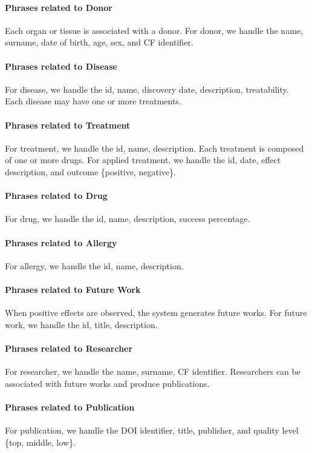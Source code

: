 \documentclass[11pt,a4paper]{article}
\begin{document}
\paragraph{Phrases related to Donor} 
Each organ or tissue is associated with a donor. For donor, we handle the name, surname, date of birth, age, sex, and CF identifier.

\paragraph{Phrases related to Disease} 
For disease, we handle the id, name, discovery date, description, treatability. Each disease may have one or more treatments.

\paragraph{Phrases related to Treatment} 
For treatment, we handle the id, name, description. Each treatment is composed of one or more drugs. For applied treatment, we handle the id, date, effect description, and outcome \{positive, negative\}.

\paragraph{Phrases related to Drug} 
For drug, we handle the id, name, description, success percentage. 

\paragraph{Phrases related to Allergy} 
For allergy, we handle the id, name, description.

\paragraph{Phrases related to Future Work} 
When positive effects are observed, the system generates future works. For future work, we handle the id, title, description.

\paragraph{Phrases related to Researcher} 
For researcher, we handle the name, surname, CF identifier. Researchers can be associated with future works and produce publications.

\paragraph{Phrases related to Publication} 
For publication, we handle the DOI identifier, title, publisher, and quality level \{top, middle, low\}.
\end{document}
